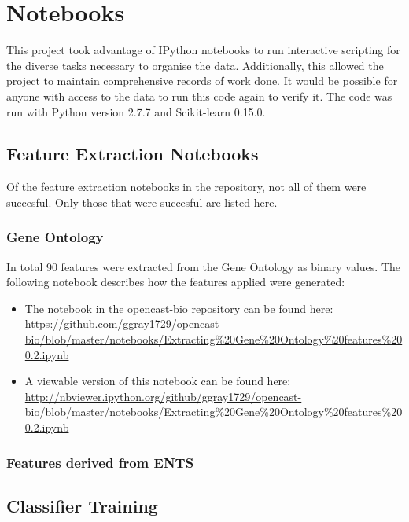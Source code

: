 \appendix
\chapter{Notebooks}

This project took advantage of IPython notebooks to run interactive scripting for the diverse tasks necessary to organise the data.
Additionally, this allowed the project to maintain comprehensive records of work done.
It would be possible for anyone with access to the data to run this code again to verify it.
The code was run with Python version 2.7.7 and Scikit-learn 0.15.0.

\section{Feature Extraction Notebooks}

Of the feature extraction notebooks in the repository, not all of them were succesful.
Only those that were succesful are listed here.

\subsection{Gene Ontology}
\label{app:go}

In total 90 features were extracted from the Gene Ontology as binary values.
The following notebook describes how the features applied were generated:

\begin{itemize}
    \item The notebook in the opencast-bio repository can be found here: \url{https://github.com/ggray1729/opencast-bio/blob/master/notebooks/Extracting%20Gene%20Ontology%20features%200.2.ipynb}
        \item A viewable version of this notebook can be found here: \url{http://nbviewer.ipython.org/github/ggray1729/opencast-bio/blob/master/notebooks/Extracting%20Gene%20Ontology%20features%200.2.ipynb}
\end{itemize}

\subsection{Features derived from ENTS}




\section{Classifier Training}
\label{app:classtrain}

